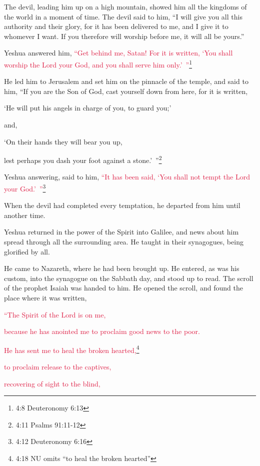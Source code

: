 \myverse{}The devil, leading him up on a high mountain, showed him all the
kingdoms of the world in a moment of time.
\myverse{}The devil said to him, “I will give you all this authority and their glory,
for it has been delivered to me, and I give it to whomever I want.
\myverse{}If you therefore will worship before me, it will all be yours.”

\myverse{}Yeshua answered him,
\textcolor{crimson}{“Get behind me, Satan! For it is written, ‘You shall worship the Lord your God, and you shall serve
	him only.’ ”}\footnote{ 4:8 Deuteronomy 6:13}

\myverse{}He led him to Jerusalem and set him on the pinnacle of the temple,
and said to him, “If you are the Son of God, cast yourself down from here,
\myverse{}for it is written,

‘He will put his angels in charge of you, to guard you;’

\myverse{}and,

‘On their hands they will bear you up,

lest perhaps you dash your foot against a stone.’ ”\footnote{ 4:11 Psalms 91:11-12
}

\myverse{}Yeshua answering, said to him,
\textcolor{crimson}{“It has been said, ‘You shall not tempt the Lord your God.’ ”}\footnote{ 4:12 Deuteronomy 6:16}

\myverse{}When the devil had completed every temptation, he departed from
him until another time.

\myverse{}Yeshua returned in the power of the Spirit into Galilee, and
news about him spread through all the surrounding area.
\myverse{}He taught in their synagogues, being glorified by all.

\myverse{}He came to Nazareth, where he had been brought up. He entered,
as was his custom, into the synagogue on the Sabbath day, and stood up to read.
\myverse{}The scroll of the prophet Isaiah was handed to him. He opened the scroll,
and found the place where it was written,

\myverse{}\textcolor{crimson}{“The Spirit of the Lord is on me,}

\textcolor{crimson}{because he has anointed me to proclaim good news to the poor.}

\textcolor{crimson}{He has sent me to heal the broken hearted,}\footnote{4:18 NU omits “to heal the broken hearted”}

\textcolor{crimson}{to proclaim release to the captives,}

\textcolor{crimson}{recovering of sight to the blind,}

